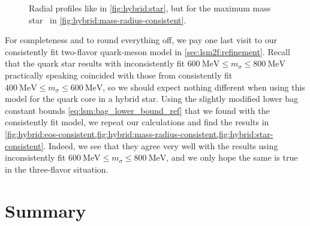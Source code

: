 \begin{figure}
\caption{\label{fig:hybrid:star-consistent}%
	Radial profiles like in \cref{fig:hybrid:star},
	but for the maximum mass star \goldenstar in \cref{fig:hybrid:mass-radius-consistent}.
}
\end{figure}

For completeness and to round everything off,
we pay one last visit to our consistently fit two-flavor quark-meson model in \cref{sec:lsm2f:refinement}.
Recall that the quark star results with inconsistently fit $\SI{600}{\mega\electronvolt} \leq m_\sigma \leq \SI{800}{\mega\electronvolt}$
practically speaking coincided with those from consistently fit $\SI{400}{\mega\electronvolt} \leq m_\sigma \leq \SI{600}{\mega\electronvolt}$,
so we should expect nothing different when using this model for the quark core in a hybrid star.
Using the slightly modified lower bag constant bounds \eqref{eq:lsm:bag_lower_bound_ref} that we found with the consistently fit model,
we repeat our calculations and find the results in \cref{fig:hybrid:eos-consistent,fig:hybrid:mass-radius-consistent,fig:hybrid:star-consistent}.
Indeed, we see that they agree very well with the results using inconsistently fit $\SI{600}{\mega\electronvolt} \leq m_\sigma \leq \SI{800}{\mega\electronvolt}$,
and we only hope the same is true in the three-flavor situation.

\section{Summary}

